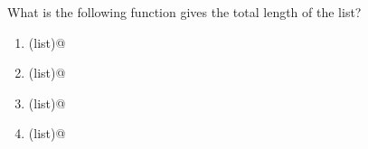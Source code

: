 \question
What is the following function gives the total length of the list?
\begin{enumerate}
\item \lstinline@cmp(list)@
\item \lstinline@len(list)@
\item \lstinline@max(list)@
\item \lstinline@min(list)@
\end{enumerate}

